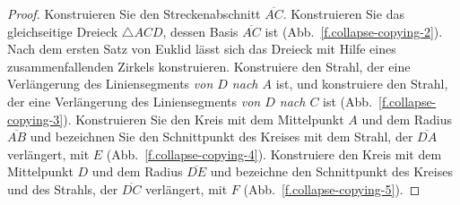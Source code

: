 \begin{proof}
Konstruieren Sie den Streckenabschnitt $\overline{AC}$. Konstruieren Sie das gleichseitige Dreieck $\triangle ACD$, dessen Basis $\overline{AC}$ ist (Abb.~\ref{f.collapse-copying-2}). Nach dem ersten Satz von Euklid lässt sich das Dreieck mit Hilfe eines zusammenfallenden Zirkels konstruieren. Konstruiere den Strahl, der eine Verlängerung des Liniensegments \emph{von $D$ nach $A$} ist, und konstruiere den Strahl, der eine Verlängerung des Liniensegments \emph{von $D$ nach $C$} ist (Abb.~\ref{f.collapse-copying-3}). Konstruieren Sie den Kreis mit dem Mittelpunkt $A$ und dem Radius $\overline{AB}$ und bezeichnen Sie den Schnittpunkt des Kreises mit dem Strahl, der $\overline{DA}$ verlängert, mit $E$ (Abb.~\ref{f.collapse-copying-4}). Konstruiere den Kreis mit dem Mittelpunkt $D$ und dem Radius $\overline{DE}$ und bezeichne den Schnittpunkt des Kreises und des Strahls, der $\overline{DC}$ verlängert, mit $F$ (Abb.~\ref{f.collapse-copying-5}).


\end{proof}
